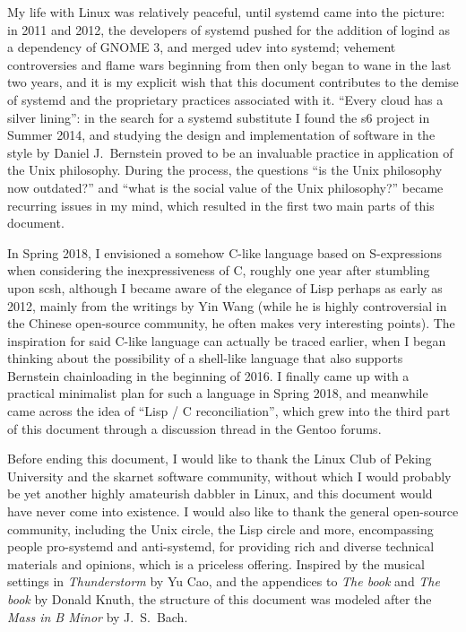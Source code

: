 \documentclass{article}
\begin{document}
My life with Linux was relatively peaceful, until systemd came into the picture:
in 2011 and 2012, the developers of systemd pushed for the addition of logind
as a dependency of GNOME 3, and merged udev into
systemd; vehement controversies and flame wars beginning
from then only began to wane in the last two years,
and it is my explicit wish that this document contributes to the demise of
systemd and the proprietary practices associated with it.  ``Every cloud has
a silver lining'': in the search for a systemd substitute I found the s6 project
in Summer 2014, and studying the design and implementation of software in the
style by Daniel J.\ Bernstein proved to be an invaluable practice in application
of the Unix philosophy.  During the process, the questions ``is the Unix
philosophy now outdated?'' and ``what is the social value of the Unix
philosophy?'' became recurring issues in my mind, which resulted
in the first two main parts of this document.

In Spring 2018, I envisioned a somehow C-like language based on S-expressions
when considering the inexpressiveness of C, roughly
one year after stumbling upon scsh, although I
became aware of the elegance of Lisp perhaps as early as 2012, mainly from
the writings by Yin Wang (while he is highly controversial in the Chinese
open-source community, he often makes very interesting points).  The
inspiration for said C-like language can actually be traced earlier, when
I began thinking about the possibility of a shell-like language that also
supports Bernstein chainloading in the beginning of
2016.  I finally came up with a practical minimalist plan for such a language%
 in Spring 2018, and meanwhile came across the idea of
``Lisp / C reconciliation'', which grew into the third part of this document
through a discussion thread in the Gentoo forums.

Before ending this document, I would like to thank the Linux Club of Peking
University and the skarnet software community, without which I would probably
be yet another highly amateurish dabbler in Linux, and this document would
have never come into existence.  I would also like to thank the general
open-source community, including the Unix circle, the Lisp circle and more,
encompassing people pro-systemd and anti-systemd, for providing rich and
diverse technical materials and opinions, which is a priceless offering.
Inspired by the musical settings in \emph{Thunderstorm} by Yu Cao,
and the appendices to \emph{The book} and \emph{The
book} by Donald Knuth, the structure of this
document was modeled after the \emph{Mass in B Minor} by J.~S.\ Bach.
\end{document}
